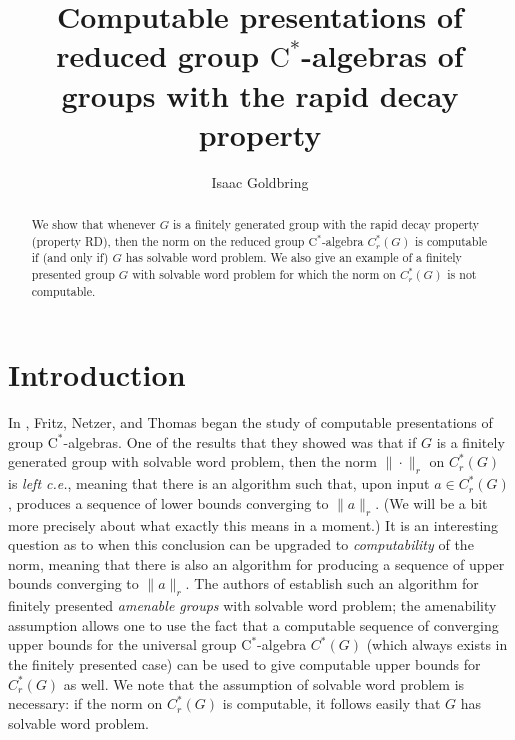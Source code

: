 \documentclass{amsart}
\newcommand{\cstar}{$\mathrm{C}^*$}
\theoremstyle{plain}
\theoremstyle{definition}
\numberwithin{equation}{section}
\begin{document}
\title[Computable presentations of RD group \cstar-algebras]{Computable presentations of reduced group \cstar-algebras of groups with the rapid decay property}


\author{Isaac Goldbring}
\address{University of California, Irvine}

\begin{abstract}
We show that whenever $G$ is a finitely generated group with the rapid decay property (property RD), then the norm on the reduced group \cstar-algebra $C^*_r(G)$ is computable if (and only if) $G$ has solvable word problem.  We also give an example of a finitely presented group $G$ with solvable word problem for which the norm on $C^*_r(G)$ is not computable.
\end{abstract}
\maketitle


\section{Introduction}\label{sec:Intro}

In \cite{canyou}, Fritz, Netzer, and Thomas began the study of computable presentations of group \cstar-algebras.  One of the results that they showed was that if $G$ is a finitely generated group with solvable word problem, then the norm $\|\cdot\|_r$ on $C^*_r(G)$ is \emph{left c.e.}, meaning that there is an algorithm such that, upon input $a\in C^*_r(G)$, produces a sequence of lower bounds converging to $\|a\|_r$.  (We will be a bit more precisely about what exactly this means in a moment.)  It is an interesting question as to when this conclusion can be upgraded to \emph{computability} of the norm, meaning that there is also an algorithm for producing a sequence of upper bounds converging to $\|a\|_r$.  The authors of \cite{canyou} establish such an algorithm for finitely presented \emph{amenable groups} with solvable word problem; the amenability assumption allows one to use the fact that a computable sequence of converging upper bounds for the universal group \cstar-algebra $C^*(G)$ (which always exists in the finitely presented case) can be used to give computable upper bounds for $C^*_r(G)$ as well.  We note that the assumption of solvable word problem is necessary:  if the norm on $C^*_r(G)$ is computable, it follows easily that $G$ has solvable word problem.  
\end{document}
